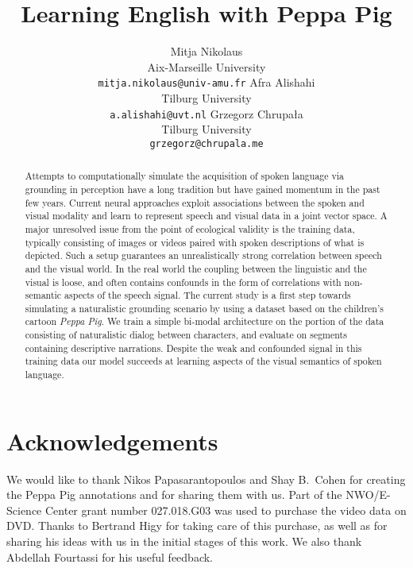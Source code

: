 \documentclass[11pt,a4paper]{article}
\begin{document}
\title{Learning English with Peppa Pig}

\author{Mitja Nikolaus\\
  Aix-Marseille University\\
  \texttt{mitja.nikolaus@univ-amu.fr}
  \And
  Afra Alishahi\\
  Tilburg University\\
  \texttt{a.alishahi@uvt.nl}
  \AND
  Grzegorz Chrupała\\
  Tilburg University\\
  \texttt{grzegorz@chrupala.me}}

\date{}


\maketitle
\begin{abstract}
  Attempts to computationally simulate the acquisition of spoken
  language via grounding in perception have a long tradition
  but have gained momentum in the past few years.  Current neural
  approaches exploit associations between the spoken and
  visual modality and learn to represent speech and visual data
  in a joint vector space. A major unresolved issue from the point
  of ecological validity is the training data, typically consisting of
  images or videos paired with spoken descriptions of what is
  depicted. Such a setup guarantees an unrealistically strong
  correlation between speech and the visual world.  In
  the real world the coupling between the linguistic and the visual is
  loose, and often contains confounds in the form of correlations with
  non-semantic aspects of the speech signal. The current study is a
  first step towards simulating a naturalistic grounding scenario by
  using a dataset based on the children's cartoon {\it Peppa Pig}. We
  train a simple bi-modal architecture on the portion of the data
  consisting of naturalistic dialog between characters, and evaluate
  on segments containing descriptive narrations. Despite the weak and confounded
  signal in this training data our model succeeds at learning aspects
  of the visual semantics of spoken language.
\end{abstract}






\section*{Acknowledgements}
We would like to thank Nikos Papasarantopoulos and Shay B.\ Cohen for
creating the Peppa Pig annotations and for sharing them with us.
Part of the NWO/E-Science Center grant number 027.018.G03 was used to
purchase the video data on DVD. Thanks to Bertrand Higy for taking care of this
purchase, as well as for sharing his ideas with us in the initial stages of
this work. We also thank Abdellah Fourtassi for his useful feedback.


%
\end{document}

